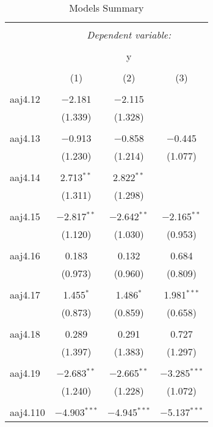 
\begin{table}[!htbp] \centering 
  \caption{Models Summary} 
  \label{} 
\begin{tabular}{@{\extracolsep{5pt}}lccc} 
\\[-1.8ex]\hline 
\hline \\[-1.8ex] 
 & \multicolumn{3}{c}{\textit{Dependent variable:}} \\ 
\cline{2-4} 
\\[-1.8ex] & \multicolumn{3}{c}{y} \\ 
\\[-1.8ex] & (1) & (2) & (3)\\ 
\hline \\[-1.8ex] 
 aaj4.12 & $-$2.181 & $-$2.115 &  \\ 
  & (1.339) & (1.328) &  \\ 
  & & & \\ 
 aaj4.13 & $-$0.913 & $-$0.858 & $-$0.445 \\ 
  & (1.230) & (1.214) & (1.077) \\ 
  & & & \\ 
 aaj4.14 & 2.713$^{**}$ & 2.822$^{**}$ &  \\ 
  & (1.311) & (1.298) &  \\ 
  & & & \\ 
 aaj4.15 & $-$2.817$^{**}$ & $-$2.642$^{**}$ & $-$2.165$^{**}$ \\ 
  & (1.120) & (1.030) & (0.953) \\ 
  & & & \\ 
 aaj4.16 & 0.183 & 0.132 & 0.684 \\ 
  & (0.973) & (0.960) & (0.809) \\ 
  & & & \\ 
 aaj4.17 & 1.455$^{*}$ & 1.486$^{*}$ & 1.981$^{***}$ \\ 
  & (0.873) & (0.859) & (0.658) \\ 
  & & & \\ 
 aaj4.18 & 0.289 & 0.291 & 0.727 \\ 
  & (1.397) & (1.383) & (1.297) \\ 
  & & & \\ 
 aaj4.19 & $-$2.683$^{**}$ & $-$2.665$^{**}$ & $-$3.285$^{***}$ \\ 
  & (1.240) & (1.228) & (1.072) \\ 
  & & & \\ 
 aaj4.110 & $-$4.903$^{***}$ & $-$4.945$^{***}$ & $-$5.137$^{***}$ \\ 

\end{tabular}
\end{table}
